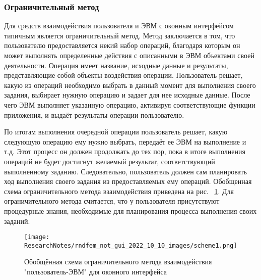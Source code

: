 \def\notedate{2022.10.10}
\def\currentauthor{Василян А.Р. (РК6-73Б)}

\subsubsection{Ограничительный метод}
	Для средств взаимодействия пользователя и ЭВМ с оконным интерфейсом типичным является ограничительный метод. Метод заключается в том, что пользователю предоставляется некий набор операций, благодаря которым он может выполнять определенные действия с описанными в ЭВМ объектами своей деятельности. Операция имеет название, исходные данные и результаты, представляющие собой объекты воздействия операции. Пользователь решает, какую из операций необходимо выбрать в данный момент для выполнения своего задания, выбирает нужную операцию и задает для нее исходные данные. После чего ЭВМ выполняет указанную операцию, активируя соответствующие функции приложения, и выдаёт результаты операции пользователю. 
	
	По итогам выполнения очередной операции пользователь решает, какую следующую операцию ему нужно выбрать, передаёт ее ЭВМ на выполнение и т.д. Этот процесс он должен продолжать до тех пор, пока в итоге выполнения операций не будет достигнут желаемый результат, соответствующий выполненному заданию. Следовательно, пользователь должен сам планировать ход выполнения своего задания из предоставляемых ему операций. Обобщенная схема ограничительного метода взаимодействия приведена на рис. ~\ref{scheme1}. Для ограничительного метода считается, что у пользователя присутствуют процедурные знания, необходимые для планирования процесса выполнения своих заданий.

\begin{figure}[!ht]
  \centering
  \texttt{[image: ResearchNotes/rndfem\_not\_gui\_2022\_10\_10\_images/scheme1.png]}
  \caption{Обобщённая схема ограничительного метода взаимодействия "пользователь-ЭВМ" для оконного интерфейса}
  \label{scheme1}
\end{figure}

